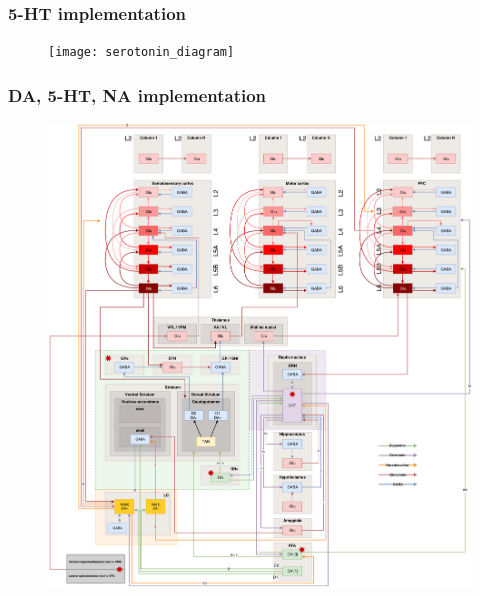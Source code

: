 \documentclass[12pt, aspectratio=169]{beamer}
\begin{document}
\begin{frame}
\frametitle{5-HT implementation}
\begin{figure}
\texttt{[image: serotonin\_diagram]}
\end{figure}
\end{frame}
\begin{frame}
\frametitle{DA, 5-HT, NA implementation}
\begin{figure}
\includegraphics[width=0.5\linewidth]{DA_5-HT_NA_pathways}
\end{figure}
\end{frame}
\end{document}
